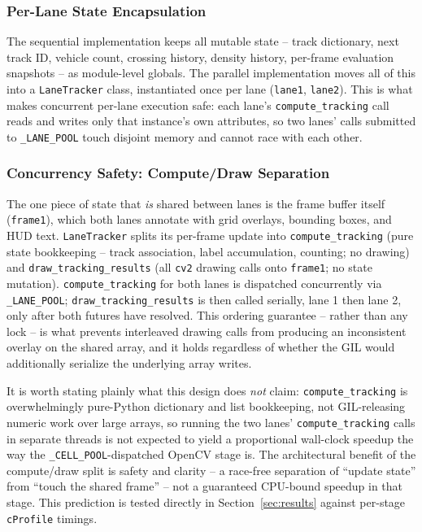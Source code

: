 \documentclass[conference]{IEEEtran}
\newcommand{\code}[1]{\texttt{#1}}
\begin{document}
\subsubsection{Per-Lane State Encapsulation}
The sequential implementation keeps all mutable state -- track
dictionary, next track ID, vehicle count, crossing history, density
history, per-frame evaluation snapshots -- as module-level globals. The
parallel implementation moves all of this into a \code{LaneTracker}
class, instantiated once per lane (\code{lane1}, \code{lane2}). This is
what makes concurrent per-lane execution safe: each lane's
\code{compute\_tracking} call reads and writes only that instance's own
attributes, so two lanes' calls submitted to \code{\_LANE\_POOL} touch
disjoint memory and cannot race with each other.

\subsubsection{Concurrency Safety: Compute/Draw Separation}
The one piece of state that \emph{is} shared between lanes is the frame
buffer itself (\code{frame1}), which both lanes annotate with grid
overlays, bounding boxes, and HUD text. \code{LaneTracker} splits its
per-frame update into \code{compute\_tracking} (pure state
bookkeeping -- track association, label accumulation, counting; no
drawing) and \code{draw\_tracking\_results} (all \code{cv2} drawing
calls onto \code{frame1}; no state mutation). \code{compute\_tracking}
for both lanes is dispatched concurrently via \code{\_LANE\_POOL};
\code{draw\_tracking\_results} is then called serially, lane 1 then
lane 2, only after both futures have resolved. This ordering guarantee
-- rather than any lock -- is what prevents interleaved drawing calls
from producing an inconsistent overlay on the shared array, and it holds
regardless of whether the GIL would additionally serialize the
underlying array writes.

It is worth stating plainly what this design does \emph{not} claim:
\code{compute\_tracking} is overwhelmingly pure-Python dictionary and
list bookkeeping, not GIL-releasing numeric work over large arrays, so
running the two lanes' \code{compute\_tracking} calls in separate
threads is not expected to yield a proportional wall-clock speedup the
way the \code{\_CELL\_POOL}-dispatched OpenCV stage is. The
architectural benefit of the compute/draw split is safety and clarity --
a race-free separation of ``update state'' from ``touch the shared
frame'' -- not a guaranteed CPU-bound speedup in that stage. This
prediction is tested directly in Section~\ref{sec:results} against
per-stage \code{cProfile} timings.
\end{document}
